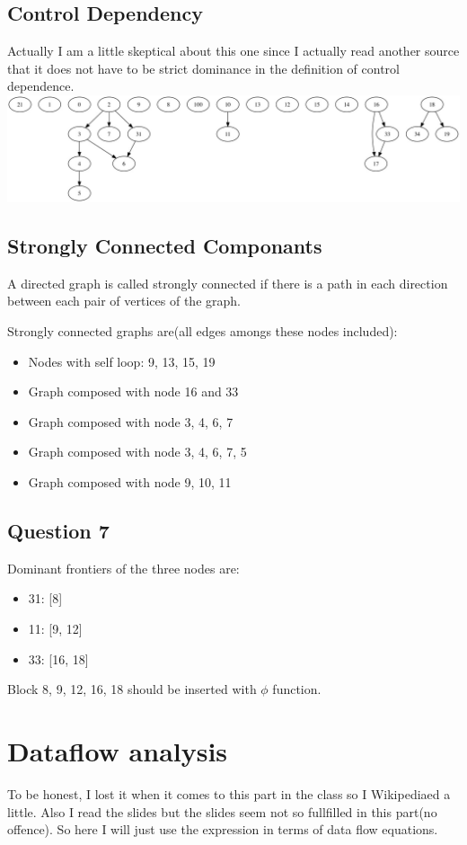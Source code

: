 \documentclass[12pt]{article}
\begin{document}
\subsection{Control Dependency}
Actually I am a little  skeptical about this one since I actually read
another source that it does not have to be strict dominance in the
definition of control dependence.
\includegraphics[scale=0.3]{cdg.jpg}

\subsection{Strongly Connected Componants}
A directed graph is called strongly connected if there is a path in
each direction between each pair of vertices of the graph.

Strongly connected graphs are(all edges amongs these nodes included):

\begin{itemize}
\item Nodes with self loop: 9, 13, 15, 19
\item Graph composed with node 16 and 33
\item Graph composed with node 3, 4, 6, 7
\item Graph composed with node 3, 4, 6, 7, 5
\item Graph composed with node 9, 10, 11
\end{itemize}


\subsection{Question 7}

Dominant frontiers of the three nodes are:
\begin{itemize}
\item 31: [8]
\item 11: [9, 12]
\item 33: [16, 18]
\end{itemize}

\noindent
Block 8, 9, 12, 16, 18 should be inserted with $\phi$ function.

\section{ Dataflow analysis}
To be honest, I lost it when it comes to this part in the class so I
Wikipediaed a little. Also I read the slides but the slides seem not
so fullfilled in this part(no offence).  So here I will just use the
expression in terms of data flow equations.
\end{document}
